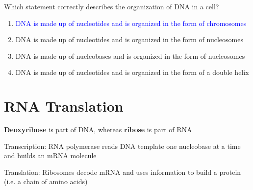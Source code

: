 \documentclass[11pt,fleqn]{book} %
\begin{document}
\begin{exercise}
    Which statement correctly describes the organization of DNA in a cell?
    \begin{enumerate}
        \item \textcolor{blue}{DNA is made up of nucleotides and is organized in the form of chromosomes}
        \item DNA is made up of nucleotides and is organized in the form of nucleosomes
        \item DNA is made up of nucleobases and is organized in the form of nucleosomes
        \item DNA is made up of nucleotides and is organized in the form of a double helix
    \end{enumerate}
\end{exercise}

\section{RNA Translation}
\textbf{Deoxyribose} is part of DNA, whereas \textbf{ribose} is part of RNA
\begin{descriptions}
    \item[Transcription:] RNA polymerase reads DNA template one nucleobase at a time and builds an mRNA molecule
    \item[Translation:] Ribosomes decode mRNA and uses information to build a protein (i.e. a chain of amino acids)
\end{descriptions}
\end{document}
